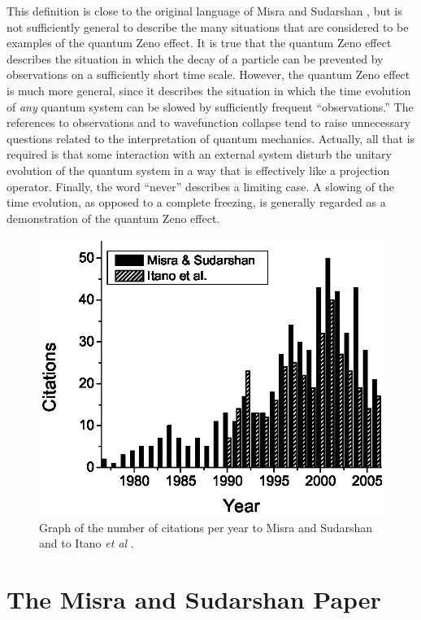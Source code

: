 \documentclass[12pt]{article}
\begin{document}
This definition is close to the original language of Misra and
Sudarshan \cite{misra77}, but is not sufficiently general to
describe the many situations that are considered to be examples of
the quantum Zeno effect. It is true that the quantum Zeno effect
describes the situation in which the decay of a particle can be
prevented by observations on a sufficiently short time scale.
However, the quantum Zeno effect is much more general, since it
describes the situation in which the time evolution of {\em any}
quantum system can be slowed by sufficiently frequent
``observations.''  The references to observations and to
wavefunction collapse tend to raise unnecessary questions related to
the interpretation of quantum mechanics. Actually, all that is
required is that some interaction with an external system disturb
the unitary evolution of the quantum system in a way that is
effectively like a projection operator. Finally, the word ``never''
describes a limiting case.  A slowing  of the time evolution, as
opposed to a complete freezing, is generally regarded as a
demonstration of the quantum Zeno effect.

\begin{figure}[htb]
\begin{center}
\includegraphics[width=5in]{cites_bw2.eps}
\end{center}
\caption{\label{citesfig}Graph of the number of citations per year
to Misra and Sudarshan  \cite{misra77} and to Itano {\em et al}
\cite{itano90}.}
\end{figure}


\section{The Misra and Sudarshan Paper}
\end{document}
